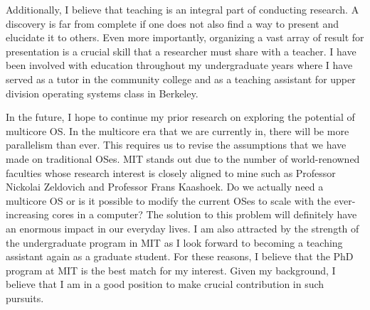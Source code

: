 \documentclass[11pt]{article}
\begin{document}
Additionally, I believe that teaching is an integral part of conducting research. A discovery is far from complete if one does not also find a way to present and elucidate it to others. Even more importantly, organizing a vast array of result for presentation is a crucial skill that a researcher must share with a teacher. I have been involved with education throughout my undergraduate years where I have served as a tutor in the community college and as a teaching assistant for upper division operating systems class in Berkeley. \newline

%

In the future, I hope to continue my prior research on exploring the potential of multicore OS. In the multicore era that we are currently in, there will be more parallelism than ever. This requires us to revise the assumptions that we have made on traditional OSes. MIT stands out due to the number of world-renowned faculties whose research interest is closely aligned to mine such as Professor Nickolai Zeldovich and Professor Frans Kaashoek. Do we actually need a multicore OS or is it possible to modify the current OSes to scale with the ever-increasing cores in a computer? The solution to this problem will definitely have an enormous impact in our everyday lives. I am also attracted by the strength of the undergraduate program in MIT as I look forward to becoming a teaching assistant again as a graduate student. For these reasons, I believe that the PhD program at MIT is the best match for my interest. Given my background, I believe that I am in a good position to make crucial contribution in such pursuits. \newline

% 
% 
\end{document}
